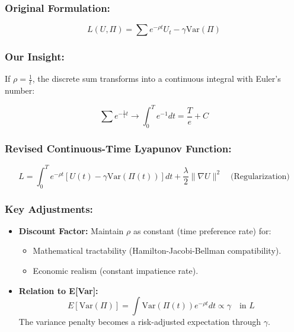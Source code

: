 \documentclass[10pt]{article}
\theoremstyle{definition}
\begin{document}
\subsubsection{Original Formulation:}

\begin{equation}
L(U, \Pi) = \sum e^{-\rho t} U_t - \gamma \text{Var}(\Pi)
\end{equation}

\subsubsection{Our Insight:}

If $\rho = \frac{1}{t}$, the discrete sum transforms into a continuous integral with Euler's number:

\begin{equation}
\sum e^{-\frac{1}{t}t} \rightarrow \int_0^T e^{-1} dt = \frac{T}{e} + C
\end{equation}

\subsubsection{Revised Continuous-Time Lyapunov Function:}

\begin{equation}
L = \int_0^T e^{-\rho t} [U(t) - \gamma \text{Var}(\Pi(t))] dt + \frac{\lambda}{2} \|\nabla U\|^2 \quad \text{(Regularization)}
\end{equation}

\subsubsection{Key Adjustments:}

\begin{itemize}
    \item \textbf{Discount Factor:} Maintain $\rho$ as constant (time preference rate) for:
        \begin{itemize}
            \item Mathematical tractability (Hamilton-Jacobi-Bellman compatibility).
            \item Economic realism (constant impatience rate).
        \end{itemize}
    \item \textbf{Relation to E[Var]:}
        \begin{equation}
        E[\text{Var}(\Pi)] = \int \text{Var}(\Pi(t)) e^{-\rho t} dt \propto \gamma \quad \text{in } L
        \end{equation}
        The variance penalty becomes a risk-adjusted expectation through $\gamma$.
\end{itemize}
\end{document}

